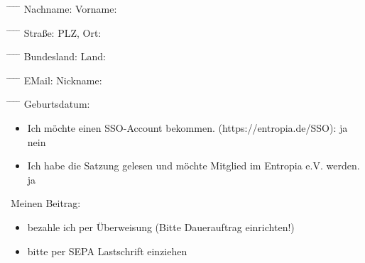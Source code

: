 \documentclass{scrartcl}
\begin{document}
\begin{tabbing}
\hspace*{3cm}\= \hspace*{6cm} \= \hspace*{2cm} \= \hspace*{4cm} \= \kill
Nachname: \> \underline{\hspace{150pt}} \> Vorname: \>  \underline{\hspace{150pt}}
\end{tabbing}
\begin{tabbing}
\hspace*{3cm}\= \hspace*{6cm} \= \hspace*{2cm} \= \hspace*{4cm} \= \kill
Stra{\ss}e: \> \underline{\hspace{150pt}} \> PLZ, Ort: \> \underline{\hspace{150pt}}
\end{tabbing}
\begin{tabbing}
\hspace*{3cm}\= \hspace*{6cm} \= \hspace*{2cm} \= \hspace*{4cm} \= \kill
Bundesland: \> \underline{\hspace{150pt}} \> Land: \> \underline{\hspace{150pt}}
\end{tabbing}
\begin{tabbing}
\hspace*{3cm}\= \hspace*{6cm} \= \hspace*{2cm} \= \hspace*{4cm} \= \kill
EMail: \> \underline{\hspace{150pt}} \> Nickname: \> \underline{\hspace{150pt}}
\end{tabbing}
\begin{tabbing}
\hspace*{3cm}\= \hspace*{6cm} \= \hspace*{2cm} \= \hspace*{4cm} \= \kill
Geburtsdatum: \> \underline{\hspace{150pt}} \>
\end{tabbing}
\begin{itemize}
\item[] Ich möchte einen SSO-Account bekommen. (https://entropia.de/SSO): \Square ja \Square nein
\item[] Ich habe die Satzung gelesen und m\"ochte Mitglied im Entropia e.V. werden.  \Square ja
\end{itemize}
Meinen Beitrag:
\begin{itemize}
\item[\Square] bezahle ich per \"Uberweisung (Bitte Dauerauftrag einrichten!)
\item[\Square] bitte per SEPA Lastschrift einziehen
\end{itemize}
\addvspace{0.4cm}
\end{document}
